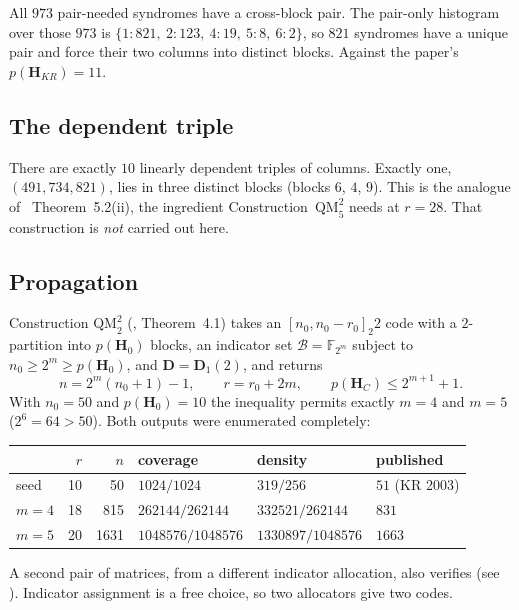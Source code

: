 \documentclass[11pt,a4paper]{article}
\newcommand{\FF}{\mathbb{F}}
\newcommand{\HH}{\boldsymbol{H}}
\begin{document}
All $973$ pair-needed syndromes have a cross-block pair. The pair-only
histogram over those $973$ is $\{1{:}821,\ 2{:}123,\ 4{:}19,\ 5{:}8,\ 6{:}2\}$,
so $821$ syndromes have a unique pair and force their two columns into
distinct blocks. Against the paper's $p(\HH_{KR})=11$.

\subsection{The dependent triple}

There are exactly $10$ linearly dependent triples of columns. Exactly one,
$(491,734,821)$, lies in three distinct blocks (blocks $6$, $4$, $9$).
This is the analogue of~\cite{DMP2025} Theorem~5.2(ii), the ingredient
Construction~$\mathrm{QM}_5^2$ needs at $r=28$. That construction is
\emph{not} carried out here.

\subsection{Propagation}
\label{sec:prop}

Construction $\mathrm{QM}_2^2$ (\cite{DMP2025}, Theorem~4.1) takes an
$[n_0,n_0-r_0]_2 2$ code with a $2$-partition into $p(\HH_0)$ blocks, an
indicator set $\mathscr{B}=\FF_{2^m}$ subject to
$n_0\ge 2^m\ge p(\HH_0)$, and $\boldsymbol{D}=\boldsymbol{D}_1(2)$, and returns
\[
n=2^m(n_0+1)-1,\qquad r=r_0+2m,\qquad p(\HH_C)\le 2^{m+1}+1.
\]
With $n_0=50$ and $p(\HH_0)=10$ the inequality permits exactly $m=4$ and
$m=5$ ($2^6=64>50$). Both outputs were enumerated completely:

\begin{center}
\renewcommand{\arraystretch}{1.15}
\begin{tabular}{@{}lrrlll@{}}
\toprule
 & $r$ & $n$ & coverage & density & published \\
\midrule
seed & 10 & 50 & $1024/1024$ & $319/256$ & $51$ (KR 2003) \\
$m=4$ & 18 & 815 & $262144/262144$ & $332521/262144$ & $831$ \\
$m=5$ & 20 & 1631 & $1048576/1048576$ & $1330897/1048576$ & $1663$ \\
\bottomrule
\end{tabular}
\end{center}

A second pair of matrices, from a different indicator allocation, also
verifies (see ). Indicator assignment is a free
choice, so two allocators give two codes.
\end{document}
